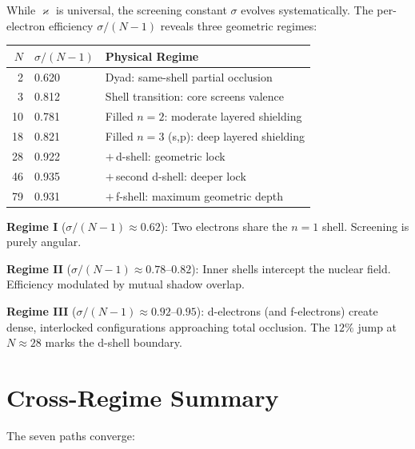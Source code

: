\documentclass[twocolumn,epjc3]{svjour3}
\newcommand{\kop}{\varkappa}  %
\begin{document}
While $\kop$ is universal, the screening constant $\sigma$ evolves systematically.  The per-electron efficiency $\sigma/(N{-}1)$ reveals three geometric regimes:

\begin{center}
\begin{tabular}{rll}
\toprule
$N$ & $\sigma/(N{-}1)$ & \textbf{Physical Regime} \\
\midrule
 2 & 0.620 & Dyad: same-shell partial occlusion \\
 3 & 0.812 & Shell transition: core screens valence \\
10 & 0.781 & Filled $n\!=\!2$: moderate layered shielding \\
18 & 0.821 & Filled $n\!=\!3$ (s,p): deep layered shielding \\
28 & 0.922 & $+$\,d-shell: geometric lock \\
46 & 0.935 & $+$\,second d-shell: deeper lock \\
79 & 0.931 & $+$\,f-shell: maximum geometric depth \\
\bottomrule
\end{tabular}
\end{center}

\textbf{Regime I} ($\sigma/(N{-}1) \approx 0.62$): Two electrons share the $n = 1$ shell.  Screening is purely angular.

\textbf{Regime II} ($\sigma/(N{-}1) \approx 0.78\text{--}0.82$): Inner shells intercept the nuclear field.  Efficiency modulated by mutual shadow overlap.

\textbf{Regime III} ($\sigma/(N{-}1) \approx 0.92\text{--}0.95$): d-electrons (and f-electrons) create dense, interlocked configurations approaching total occlusion.  The $12\%$ jump at $N \approx 28$ marks the d-shell boundary.


\section{Cross-Regime Summary}
\label{sec:summary}

The seven paths converge:
\end{document}
